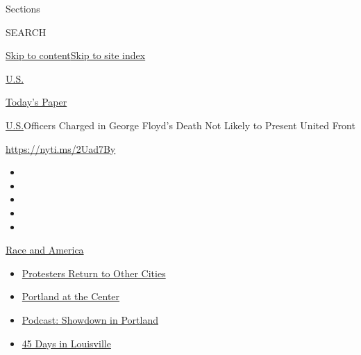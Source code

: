 Sections

SEARCH

\protect\hyperlink{site-content}{Skip to
content}\protect\hyperlink{site-index}{Skip to site index}

\href{https://www.nytimes3xbfgragh.onion/section/us}{U.S.}

\href{https://myaccount.nytimes3xbfgragh.onion/auth/login?response_type=cookie\&client_id=vi}{}

\href{https://www.nytimes3xbfgragh.onion/section/todayspaper}{Today's
Paper}

\href{/section/us}{U.S.}\textbar{}Officers Charged in George Floyd's
Death Not Likely to Present United Front

\url{https://nyti.ms/2Uad7By}

\begin{itemize}
\item
\item
\item
\item
\item
\end{itemize}

\href{https://www.nytimes3xbfgragh.onion/news-event/george-floyd-protests-minneapolis-new-york-los-angeles?action=click\&pgtype=Article\&state=default\&region=TOP_BANNER\&context=storylines_menu}{Race
and America}

\begin{itemize}
\tightlist
\item
  \href{https://www.nytimes3xbfgragh.onion/2020/07/26/us/protests-portland-seattle-trump.html?action=click\&pgtype=Article\&state=default\&region=TOP_BANNER\&context=storylines_menu}{Protesters
  Return to Other Cities}
\item
  \href{https://www.nytimes3xbfgragh.onion/2020/07/24/us/portland-oregon-protests-white-race.html?action=click\&pgtype=Article\&state=default\&region=TOP_BANNER\&context=storylines_menu}{Portland
  at the Center}
\item
  \href{https://www.nytimes3xbfgragh.onion/2020/07/23/podcasts/the-daily/portland-protests.html?action=click\&pgtype=Article\&state=default\&region=TOP_BANNER\&context=storylines_menu}{Podcast:
  Showdown in Portland}
\item
  \href{https://www.nytimes3xbfgragh.onion/interactive/2020/07/16/us/black-lives-matter-protests-louisville-breonna-taylor.html?action=click\&pgtype=Article\&state=default\&region=TOP_BANNER\&context=storylines_menu}{45
  Days in Louisville}
\end{itemize}

